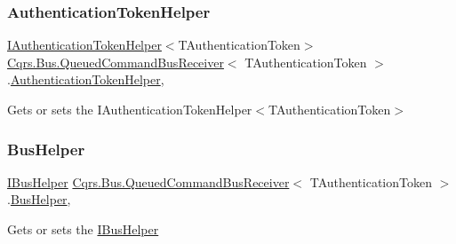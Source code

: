 \subsubsection{\texorpdfstring{Authentication\+Token\+Helper}{AuthenticationTokenHelper}}
{\footnotesize\ttfamily \hyperlink{interfaceCqrs_1_1Authentication_1_1IAuthenticationTokenHelper}{I\+Authentication\+Token\+Helper}$<$T\+Authentication\+Token$>$ \hyperlink{classCqrs_1_1Bus_1_1QueuedCommandBusReceiver}{Cqrs.\+Bus.\+Queued\+Command\+Bus\+Receiver}$<$ T\+Authentication\+Token $>$.\hyperlink{classCqrs_1_1Authentication_1_1AuthenticationTokenHelper}{Authentication\+Token\+Helper}\hspace{0.3cm}{\ttfamily [get]}, {\ttfamily [protected]}}



Gets or sets the I\+Authentication\+Token\+Helper$<$\+T\+Authentication\+Token$>$ 

\mbox{\label{classCqrs_1_1Bus_1_1QueuedCommandBusReceiver_acc1fa8c5074a43382bcf21805b4ee709_acc1fa8c5074a43382bcf21805b4ee709}} 
\subsubsection{\texorpdfstring{Bus\+Helper}{BusHelper}}
{\footnotesize\ttfamily \hyperlink{interfaceCqrs_1_1Bus_1_1IBusHelper}{I\+Bus\+Helper} \hyperlink{classCqrs_1_1Bus_1_1QueuedCommandBusReceiver}{Cqrs.\+Bus.\+Queued\+Command\+Bus\+Receiver}$<$ T\+Authentication\+Token $>$.\hyperlink{classCqrs_1_1Bus_1_1BusHelper}{Bus\+Helper}\hspace{0.3cm}{\ttfamily [get]}, {\ttfamily [protected]}}



Gets or sets the \hyperlink{interfaceCqrs_1_1Bus_1_1IBusHelper}{I\+Bus\+Helper} 

\mbox{\label{classCqrs_1_1Bus_1_1QueuedCommandBusReceiver_acd7c3367d16742abd5e650f6bacf4df9_acd7c3367d16742abd5e650f6bacf4df9}} 
